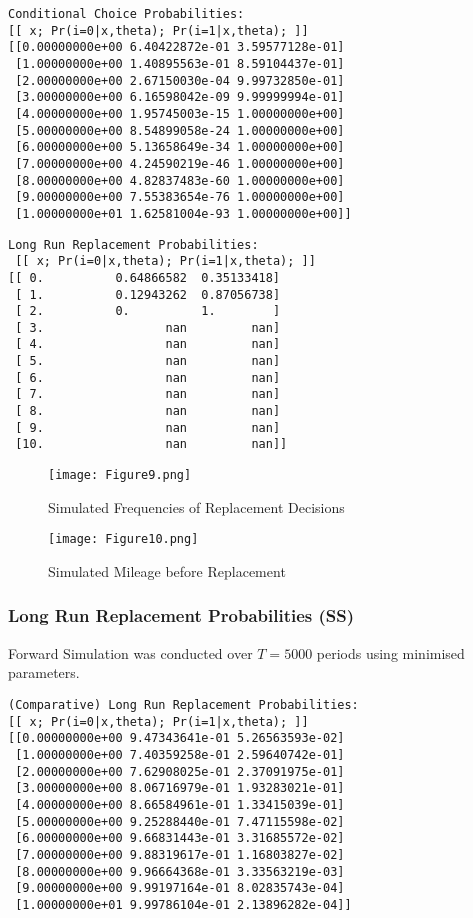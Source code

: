 \documentclass{article}
\begin{document}
\begin{lstlisting}
Conditional Choice Probabilities:
[[ x; Pr(i=0|x,theta); Pr(i=1|x,theta); ]]
[[0.00000000e+00 6.40422872e-01 3.59577128e-01]
 [1.00000000e+00 1.40895563e-01 8.59104437e-01]
 [2.00000000e+00 2.67150030e-04 9.99732850e-01]
 [3.00000000e+00 6.16598042e-09 9.99999994e-01]
 [4.00000000e+00 1.95745003e-15 1.00000000e+00]
 [5.00000000e+00 8.54899058e-24 1.00000000e+00]
 [6.00000000e+00 5.13658649e-34 1.00000000e+00]
 [7.00000000e+00 4.24590219e-46 1.00000000e+00]
 [8.00000000e+00 4.82837483e-60 1.00000000e+00]
 [9.00000000e+00 7.55383654e-76 1.00000000e+00]
 [1.00000000e+01 1.62581004e-93 1.00000000e+00]]
\end{lstlisting}

\begin{lstlisting}
Long Run Replacement Probabilities:
 [[ x; Pr(i=0|x,theta); Pr(i=1|x,theta); ]]
[[ 0.          0.64866582  0.35133418]
 [ 1.          0.12943262  0.87056738]
 [ 2.          0.          1.        ]
 [ 3.                 nan         nan]
 [ 4.                 nan         nan]
 [ 5.                 nan         nan]
 [ 6.                 nan         nan]
 [ 7.                 nan         nan]
 [ 8.                 nan         nan]
 [ 9.                 nan         nan]
 [10.                 nan         nan]]
\end{lstlisting}

\begin{figure}[h]
\begin{center}
\texttt{[image: Figure9.png]}
\caption{Simulated Frequencies of Replacement Decisions}
\end{center}
\end{figure}
\FloatBarrier

\begin{figure}[h]
\begin{center}
\texttt{[image: Figure10.png]}
\caption{Simulated Mileage before Replacement}
\end{center}
\end{figure}
\FloatBarrier

\subsubsection{Long Run Replacement Probabilities (SS)}

Forward Simulation was conducted over $T=5000$ periods using minimised parameters.

\begin{lstlisting}
(Comparative) Long Run Replacement Probabilities:
[[ x; Pr(i=0|x,theta); Pr(i=1|x,theta); ]]
[[0.00000000e+00 9.47343641e-01 5.26563593e-02]
 [1.00000000e+00 7.40359258e-01 2.59640742e-01]
 [2.00000000e+00 7.62908025e-01 2.37091975e-01]
 [3.00000000e+00 8.06716979e-01 1.93283021e-01]
 [4.00000000e+00 8.66584961e-01 1.33415039e-01]
 [5.00000000e+00 9.25288440e-01 7.47115598e-02]
 [6.00000000e+00 9.66831443e-01 3.31685572e-02]
 [7.00000000e+00 9.88319617e-01 1.16803827e-02]
 [8.00000000e+00 9.96664368e-01 3.33563219e-03]
 [9.00000000e+00 9.99197164e-01 8.02835743e-04]
 [1.00000000e+01 9.99786104e-01 2.13896282e-04]]
\end{lstlisting}
\end{document}
